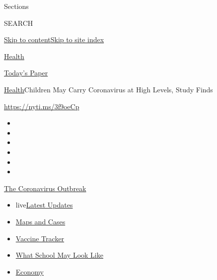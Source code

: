 Sections

SEARCH

\protect\hyperlink{site-content}{Skip to
content}\protect\hyperlink{site-index}{Skip to site index}

\href{https://www.nytimes.com/section/health}{Health}

\href{https://myaccount.nytimes.com/auth/login?response_type=cookie\&client_id=vi}{}

\href{https://www.nytimes.com/section/todayspaper}{Today's Paper}

\href{/section/health}{Health}\textbar{}Children May Carry Coronavirus
at High Levels, Study Finds

\url{https://nyti.ms/3f9oeCp}

\begin{itemize}
\item
\item
\item
\item
\item
\item
\end{itemize}

\href{https://www.nytimes.com/news-event/coronavirus?action=click\&pgtype=Article\&state=default\&region=TOP_BANNER\&context=storylines_menu}{The
Coronavirus Outbreak}

\begin{itemize}
\tightlist
\item
  live\href{https://www.nytimes.com/2020/08/01/world/coronavirus-covid-19.html?action=click\&pgtype=Article\&state=default\&region=TOP_BANNER\&context=storylines_menu}{Latest
  Updates}
\item
  \href{https://www.nytimes.com/interactive/2020/us/coronavirus-us-cases.html?action=click\&pgtype=Article\&state=default\&region=TOP_BANNER\&context=storylines_menu}{Maps
  and Cases}
\item
  \href{https://www.nytimes.com/interactive/2020/science/coronavirus-vaccine-tracker.html?action=click\&pgtype=Article\&state=default\&region=TOP_BANNER\&context=storylines_menu}{Vaccine
  Tracker}
\item
  \href{https://www.nytimes.com/interactive/2020/07/29/us/schools-reopening-coronavirus.html?action=click\&pgtype=Article\&state=default\&region=TOP_BANNER\&context=storylines_menu}{What
  School May Look Like}
\item
  \href{https://www.nytimes.com/live/2020/07/31/business/stock-market-today-coronavirus?action=click\&pgtype=Article\&state=default\&region=TOP_BANNER\&context=storylines_menu}{Economy}
\end{itemize}

